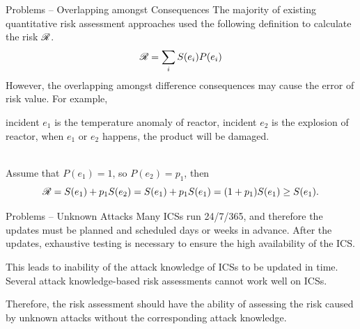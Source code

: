 \begin{frame}{Problems -- Overlapping amongst Consequences}
    The majority of existing quantitative risk assessment approaches used the following definition to calculate the risk $\mathscr{R}$.
    \[
        \mathscr{R} = \sum_i S(e_i)P(e_i)
    \]
    However, the overlapping amongst difference consequences may cause the error of risk value. For example,
    \vspace{10pt}\\
    \begin{minipage}[l]{0.2\textwidth}
      
    \end{minipage}
    \begin{minipage}[l]{0.8\textwidth}
        incident $e_1$ is the temperature anomaly of reactor, incident $e_2$ is the explosion of reactor, when $e_1$ or $e_2$ happens, the product will be damaged.
    \end{minipage}
    \vspace{10pt}\\
    Assume that $P(e_1) = 1$, so $P(e_2) = p_1$, then
    \[
        \mathscr{R} = S(e_1) + p_1S(e_2) = S(e_1) + p_1S(e_1) = (1+p_1)S(e_1) \geq S(e_1)\text{.}
    \]
\end{frame}

\begin{frame}{Problems -- Unknown Attacks}
    Many ICSs run 24/7/365, and therefore the updates must be planned and scheduled days or weeks in advance. After the updates, exhaustive testing is necessary to ensure the high availability of the ICS.

    This leads to inability of the attack knowledge of ICSs to be updated in time. Several attack knowledge-based risk assessments cannot work well on ICSs.

    Therefore, the risk assessment should have the ability of assessing the risk caused by unknown attacks without the corresponding attack knowledge.
\end{frame} 